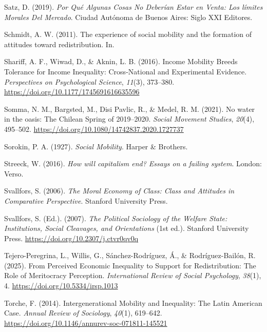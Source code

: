 \documentclass[
  13pt,
]{article}
\newlength{\cslhangindent}
\newenvironment{CSLReferences}[2] %
 {\begin{list}{}{%
  \setlength{\itemindent}{0pt}
  \setlength{\leftmargin}{0pt}
  \setlength{\parsep}{0pt}
  \ifodd #1
   \setlength{\leftmargin}{\cslhangindent}
   \setlength{\itemindent}{-1\cslhangindent}
  \fi
  \setlength{\itemsep}{#2\baselineskip}}}
 {\end{list}}
\begin{document}
\begin{CSLReferences}{1}{0}
Satz, D. (2019). \emph{{Por Qu{é} Algunas Cosas No Deber{í}an Estar en
Venta: Los l{í}mites Morales Del Mercado}}. Ciudad Aut{ó}noma de Buenos
Aires: Siglo XXI Editores.

Schmidt, A. W. (2011). The experience of social mobility and the
formation of attitudes toward redistribution. In.

Shariff, A. F., Wiwad, D., \& Aknin, L. B. (2016). Income {Mobility
Breeds Tolerance} for {Income Inequality}: {Cross-National} and
{Experimental Evidence}. \emph{Perspectives on Psychological Science},
\emph{11}(3), 373--380. \url{https://doi.org/10.1177/1745691616635596}

Somma, N. M., Bargsted, M., Disi Pavlic, R., \& Medel, R. M. (2021). No
water in the oasis: The {Chilean Spring} of 2019--2020. \emph{Social
Movement Studies}, \emph{20}(4), 495--502.
\url{https://doi.org/10.1080/14742837.2020.1727737}

Sorokin, P. A. (1927). \emph{Social {Mobility}}. Harper \& Brothers.

Streeck, W. (2016). \emph{How will capitalism end? Essays on a failing
system}. London: Verso.

Svallfors, S. (2006). \emph{The {Moral Economy} of {Class}: {Class} and
{Attitudes} in {Comparative Perspective}}. Stanford University Press.

Svallfors, S. (Ed.). (2007). \emph{The {Political Sociology} of the
{Welfare State}: {Institutions}, {Social Cleavages}, and {Orientations}}
(1st ed.). Stanford University Press.
\url{https://doi.org/10.2307/j.ctvr0qv0q}

Tejero-Peregrina, L., Willis, G., Sánchez-Rodríguez, Á., \&
Rodríguez-Bailón, R. (2025). From {Perceived Economic Inequality} to
{Support} for {Redistribution}: {The Role} of {Meritocracy Perception}.
\emph{International Review of Social Psychology}, \emph{38}(1), 4.
\url{https://doi.org/10.5334/irsp.1013}

Torche, F. (2014). Intergenerational {Mobility} and {Inequality}: {The
Latin American Case}. \emph{Annual Review of Sociology}, \emph{40}(1),
619--642. \url{https://doi.org/10.1146/annurev-soc-071811-145521}


\end{CSLReferences}
\end{document}
